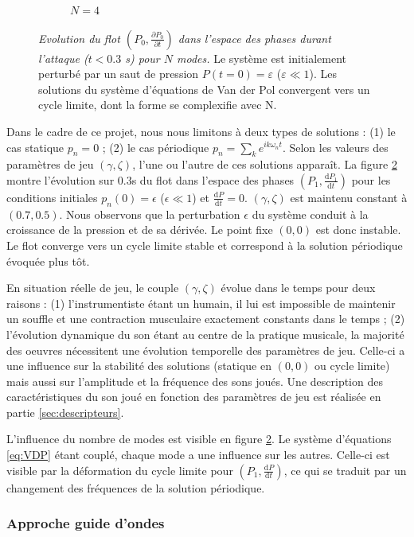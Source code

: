 \begin{figure}
\begin{subfigure}[b]{.49\linewidth}
        \caption{$N=4$}
        \label{fig:VDP_phase_N4}
    \end{subfigure}
    \caption{\emph{Evolution du flot $(P_0,\frac{\partial P_0}{\partial t})$ dans l'espace des phases durant l'attaque ($t<0.3$ s) pour $N$ modes.} Le système est initialement perturbé par un saut de pression $P(t=0)=\varepsilon$ ($\varepsilon \ll 1$). Les solutions du système d'équations de Van der Pol convergent vers un cycle limite, dont la forme se complexifie avec N.}
    \label{fig:VDP_phase}
\end{figure}

Dans le cadre de ce projet, nous nous limitons à deux types de solutions : (1) le cas statique $p_n=0$ ; (2) le cas périodique $p_n=\sum_ke^{ik\omega_nt}$. Selon les valeurs des paramètres de jeu $(\gamma,\zeta)$, l'une ou l'autre de ces solutions apparaît. La figure \ref{fig:VDP_phase} montre l'évolution sur $0.3$s du flot dans l'espace des phases $(P_1, \frac{\text{d}P_1}{\text{d}t})$ pour les conditions initiales $p_n(0)=\epsilon$ ($\epsilon\ll1$) et $\frac{\text{d}P}{\text{d}t}=0$. $(\gamma,\zeta)$ est maintenu constant à $(0.7,0.5)$. Nous observons que la perturbation $\epsilon$ du système conduit à la croissance de la pression et de sa dérivée. Le point fixe $(0,0)$ est donc instable. Le flot converge vers un cycle limite stable et correspond à la solution périodique évoquée plus tôt.

En situation réelle de jeu, le couple $(\gamma, \zeta)$ évolue dans le temps pour deux raisons : (1) l'instrumentiste étant un humain, il lui est impossible de maintenir un souffle et une contraction musculaire exactement constants dans le temps ; (2) l'évolution dynamique du son étant au centre de la pratique musicale, la majorité des oeuvres nécessitent une évolution temporelle des paramètres de jeu. Celle-ci a une influence sur la stabilité des solutions (statique en $(0,0)$ ou cycle limite) mais aussi sur l'amplitude et la fréquence des sons joués. Une description des caractéristiques du son joué en fonction des paramètres de jeu est réalisée en partie \ref{sec:descripteurs}. 

L'influence du nombre de modes est visible en figure \ref{fig:VDP_phase}. Le système d'équations \eqref{eq:VDP} étant couplé, chaque mode a une influence sur les autres. Celle-ci est visible par la déformation du cycle limite pour $(P_1, \frac{\text{d}P}{\text{d}t})$, ce qui se traduit par un changement des fréquences de la solution périodique. 


\subsubsection{Approche guide d'ondes}

